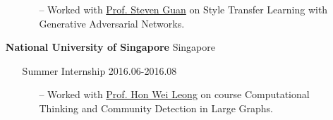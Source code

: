 \documentclass[11pt]{article}
\begin{document}
\begin{itemize}[leftmargin=0em, noitemsep, nolistsep]
\begin{itemize}[noitemsep, nolistsep, leftmargin=0em]
             \begin{itemize}
                \small
                \item[--] Worked with \href{https://www.xjtlu.edu.cn/en/departments/academic-departments/computer-science-and-software-engineering/staff/steven-guan}{Prof. Steven Guan} on Style Transfer Learning with Generative Adversarial Networks.
             \end{itemize}
        \end{itemize} 
    \item[] \large\textbf{National University of Singapore} \hfill Singapore
        \begin{itemize}[noitemsep, nolistsep, leftmargin=0em]
            \item[] Summer Internship \hfill 2016.06-2016.08
            \begin{itemize}
                \small
                \item[--] Worked with \href{https://www.comp.nus.edu.sg/~leonghw/}{Prof. Hon Wei Leong} on course Computational Thinking and Community Detection in Large Graphs.
            \end{itemize}
        \end{itemize} 
\end{itemize}
\end{document}
